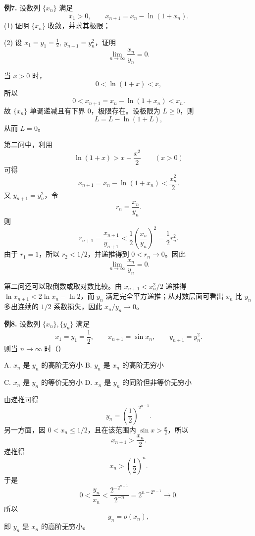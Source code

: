 \begin{problemblock}
\textbf{例7.} 设数列 \(\{x_n\}\) 满足
\[
x_1>0,\qquad x_{n+1}=x_n-\ln(1+x_n).
\]
(1) 证明 \(\{x_n\}\) 收敛，并求其极限；

(2) 设 \(x_1=y_1=\frac12,\ y_{n+1}=y_n^2\)，证明
\[
\lim_{n\to\infty}\frac{x_n}{y_n}=0.
\]
\end{problemblock}

\begin{solutionblock}

当 \(x>0\) 时，
\[
0<\ln(1+x)<x,
\]
所以
\[
0<x_{n+1}=x_n-\ln(1+x_n)<x_n.
\]
故 \(\{x_n\}\) 单调递减且有下界 0，极限存在。设极限为 \(L\ge0\)，则
\[
L=L-\ln(1+L),
\]
从而 \(L=0\)。

第二问中，利用
\[
\ln(1+x)>x-\frac{x^2}{2}\qquad(x>0)
\]
可得
\[
x_{n+1}=x_n-\ln(1+x_n)<\frac{x_n^2}{2}.
\]
又 \(y_{n+1}=y_n^2\)，令
\[
r_n=\frac{x_n}{y_n}.
\]
则
\[
r_{n+1}=\frac{x_{n+1}}{y_{n+1}}<\frac12\left(\frac{x_n}{y_n}\right)^2=\frac12 r_n^2.
\]
由于 \(r_1=1\)，所以 \(r_2<1/2\)，并递推得到 \(0<r_n\to0\)。因此
\[
\lim_{n\to\infty}\frac{x_n}{y_n}=0.
\]

第二问还可以取倒数或取对数比较。由 \(x_{n+1}<x_n^2/2\) 递推得 \(\ln x_{n+1}<2\ln x_n-\ln2\)，而 \(y_n\) 满足完全平方递推；从对数层面可看出 \(x_n\) 比 \(y_n\) 多出连续的 \(1/2\) 系数损失，因此 \(x_n/y_n\to0\)。
\end{solutionblock}

\begin{problemblock}
\textbf{例8.} 设数列 \(\{x_n\},\{y_n\}\) 满足
\[
x_1=y_1=\frac12,\qquad x_{n+1}=\sin x_n,\qquad y_{n+1}=y_n^2.
\]
则当 \(n\to\infty\) 时（\quad）

A. \(x_n\) 是 \(y_n\) 的高阶无穷小 \qquad
B. \(y_n\) 是 \(x_n\) 的高阶无穷小

C. \(x_n\) 是 \(y_n\) 的等价无穷小 \qquad
D. \(x_n\) 是 \(y_n\) 的同阶但非等价无穷小
\end{problemblock}

\begin{solutionblock}

由递推可得
\[
y_n=\left(\frac12\right)^{2^{n-1}}.
\]
另一方面，因 \(0<x_n\le1/2\)，且在该范围内 \(\sin x>\frac{x}{2}\)，所以
\[
x_{n+1}>\frac{x_n}{2}.
\]
递推得
\[
x_n>\left(\frac12\right)^n.
\]
于是
\[
0<\frac{y_n}{x_n}
<\frac{2^{-2^{n-1}}}{2^{-n}}
=2^{n-2^{n-1}}\to0.
\]
所以
\[
y_n=o(x_n),
\]
即 \(y_n\) 是 \(x_n\) 的高阶无穷小。

\end{solutionblock}

